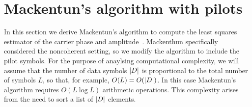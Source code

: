 \documentclass[journal]{IEEEtran}
\begin{document}
\section{Mackentun's algorithm with pilots}\label{sec:least-squar-estim}

In this section we derive Mackentun's algorithm to compute the least squares estimator of the carrier phase and amplitude~\cite{Mackenthun1994}.  Mackenthun specifically considered the noncoherent setting, so we modify the algorithm to include the pilot symbols.  For the purpose of anaylsing computational complexity, we will assume that the number of data symbols ${\left\vert D \right\vert}$ is proportional to the total number of symbols $L$, so that, for example, $O(L) = O({\left\vert D \right\vert})$.  In this case Mackentun's algorithm requires $O(L \log L)$ arithmetic operations.  This complexity arises from the need to sort a list of ${\left\vert D \right\vert}$ elements.  

\end{document}

